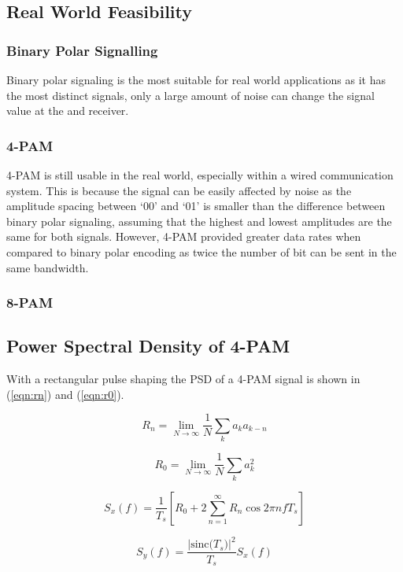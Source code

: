 \subsection{Real World Feasibility}

\subsubsection{Binary Polar Signalling}
Binary polar signaling is the most suitable for real world applications as it has the most distinct signals, only a large amount of noise can change the signal value at the
and receiver.

\subsubsection{4-PAM}
4-PAM is still usable in the real world, especially within a wired communication system. This is because the signal can be easily affected by noise as the amplitude
spacing between `00' and `01' is smaller than the difference between binary polar signaling, assuming that the highest and lowest amplitudes are the same for both signals.
However, 4-PAM provided greater data rates when compared to binary polar encoding as twice the number of bit can be sent in the same bandwidth.

\subsubsection{8-PAM}

\subsection{Power Spectral Density of 4-PAM}

With a rectangular pulse shaping the PSD of a 4-PAM signal is shown in (\ref{eqn:rn}) and (\ref{eqn:r0}).

\begin{equation}
    \label{eqn:rn}
    R_n=\lim_{N\to\infty} \frac{1}{N} \sum_{k}a_k a_{k-n}
\end{equation}

\begin{equation}
    \label{eqn:r0}
    R_0 = \lim_{N\to\infty} \frac{1}{N} \sum_{k} a_k^2   
\end{equation}

\begin{equation}
    \label{eqn:sx}
     S_x(f) = \frac{1}{T_s}[R_0 + 2 \sum_{n=1}^{\infty}{R_n \cos 2 \pi n f T_s}]
\end{equation}

\begin{equation}
    \label{eqn:PSD-4-PAM-rect}
    S_y(f) = \frac{|\textrm{sinc(} T_s \textrm{)}|^2}{T_s}S_x(f)
\end{equation}